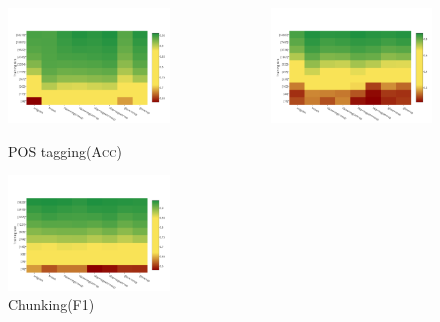 \documentclass{beamer}
\newcommand{\task}[1]{\textsf{#1}\xspace}
\newcommand{\pos}{\task{POS tagging}}
\newcommand{\chunking}{\task{Chunking}}
\newcommand{\evmeasure}[1]{\textsc{#1}\xspace}
\newcommand{\accuracy}{\evmeasure{Acc}}
\newcommand{\fscore}{\evmeasure{F1}}
\begin{document}
\begin{frame}[plain]
\begin{columns}
  \begin{figure}
    \includegraphics[scale=0.22]{../plots/map-pos-color-invert}    	   
    \caption{\pos (\accuracy)}	
	\vspace{-0.3cm}
    \includegraphics[scale=0.22]{../plots/map-chunk-color-invert}
   	\caption{\chunking (\fscore)}		
  \end{figure}  
    \begin{figure}
    \includegraphics[scale=0.22]{../plots/map-ner-color-invert}    	

\end{figure}
\end{columns}
\end{frame}
\end{document}
